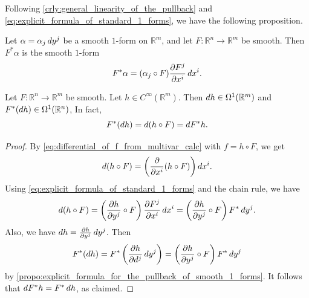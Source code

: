 \documentclass[notoc,notitlepage]{tufte-book}
\begin{document}
Following \cref{crly:general_linearity_of_the_pullback} and
\cref{eq:explicit_formula_of_standard_1_forms}, we have the following proposition.

\begin{propo}\label{propo:explicit_formula_for_the_pullback_of_smooth_1_forms}
  Let $\alpha = \alpha_j \mathop{}\!d{y^j}$ be a smooth $1$-form on $\mathbb{R}^m$, and let $F :
  \mathbb{R}^n \to \mathbb{R}^m$ be smooth. Then $F^* \alpha$ is the smooth $1$-form
  \begin{equation*}
    F^* \alpha = (\alpha_j \circ F) \frac{\partial F^j}{\partial x^i} \mathop{}\!d{x^i}.
  \end{equation*}
\end{propo}

\begin{crly}\label{crly:commutativity_of_the_pullback_and_the_exterior_derivative_on_smooth_0_forms}
  Let $F : \mathbb{R}^n \to \mathbb{R}^m$ be smooth. Let $h \in C^\infty(\mathbb{R}^m)$.
  Then $\mathop{}\!d{h} \in \Omega^1(\mathbb{R}^m)$ and $F^*(\mathop{}\!d{h}) \in \Omega^1(\mathbb{R}^n)$,
  In fact,
  \begin{equation*}
    F^* (\mathop{}\!d{h}) = \mathop{}\!d{(h \circ F)} = \mathop{}\!d{F^* h}.
  \end{equation*}
\end{crly}

\begin{proof}
  By \cref{eq:differential_of_f_from_multivar_calc} with $f = h \circ F$, we get
  \begin{equation*}
    \mathop{}\!d{(h \circ F)} = \left( \frac{\partial}{\partial x^i} (h \circ F) \right)
    \mathop{}\!d{x^i}.
  \end{equation*}
  Using \cref{eq:explicit_formula_of_standard_1_forms} and the chain rule, we have
  \begin{equation*}
    \mathop{}\!d{(h \circ F)} = \left( \frac{\partial h}{\partial y^j} \circ F \right)
    \frac{\partial F^j}{\partial x^i} \mathop{}\!d{x^i} = \left( \frac{\partial h}{\partial y^j}
    \circ F \right) F^* \mathop{}\!d{y^j}.
  \end{equation*}
  Also, we have $\mathop{}\!d{h} = \frac{\partial h}{\partial y^j} \mathop{}\!d{y^j}$. Then
  \begin{equation*}
    F^*(\mathop{}\!d{h}) = F^* \left(\frac{\partial h}{\partial d^j} \mathop{}\!d{y^j}\right) = \left(
    \frac{\partial h}{\partial y^j} \circ F \right) F^* \mathop{}\!d{y^j}
  \end{equation*}
  by \cref{propo:explicit_formula_for_the_pullback_of_smooth_1_forms}. It follows that
  $\mathop{}\!d{F^* h} = F^* \mathop{}\!d{h}$, as claimed.
\end{proof}
\end{document}
